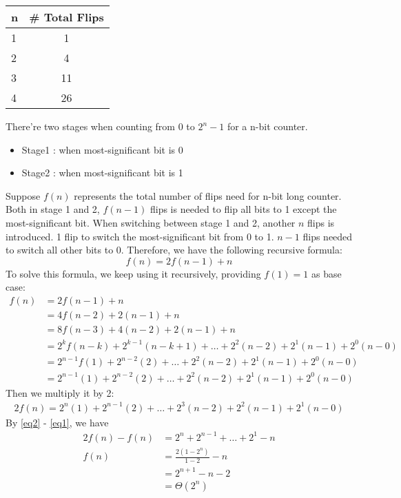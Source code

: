 \documentclass[11pt]{article}
\begin{document}
\begin{tabular}{l | c}
    n	&   \# Total Flips  \\\hline
    1  &   1  \\  
    2  &   4  \\
    3  &   11 \\
    4  &   26 \\
\end{tabular}

There're two stages when counting from 0 to $2^n-1$ for a n-bit counter. 

\begin{itemize}
	\item Stage1 : when most-significant bit is 0
	\item Stage2 : when most-significant bit is 1
\end{itemize}

Suppose $f(n)$ represents the total number of flips need for n-bit long counter. Both in stage 1 and 2, $f(n-1)$ flips is needed to flip all bits to 1 except the most-significant bit. When switching between stage 1 and 2, another $n$ flips is introduced. 1 flip to switch the most-significant bit from 0 to 1. $n-1$ flips needed to switch all other bits to 0. Therefore, we have the following recursive formula:
\[
	f(n) = 2f(n-1) + n
\]
To solve this formula, we keep using it recursively, providing $f(1) = 1$ as base case:
 \begin{align}
 	f(n) 	&= 2f(n-1) + n \nonumber \\
		&= 4f(n-2) + 2(n-1) + n \nonumber \\
		&= 8f(n-3) + 4(n-2) + 2(n-1) + n \nonumber \\
		&= 2^kf(n-k) + 2^{k-1}(n-k+1) + \ldots + 2^2(n-2) + 2^1(n-1) + 2^0(n-0) \nonumber \\
		&= 2^{n-1}f(1) + 2^{n-2}(2) + \ldots + 2^2(n-2) + 2^1(n-1) + 2^0(n-0) \nonumber  \\
		&= 2^{n-1}(1) + 2^{n-2}(2) + \ldots + 2^2(n-2) + 2^1(n-1) + 2^0(n-0) \label{eq1} 
 \end{align}
Then we multiply it by 2:
 \begin{align}
	2f(n) =  2^{n}(1) + 2^{n-1}(2) + \ldots + 2^3(n-2) + 2^2(n-1) + 2^1(n-0) \label{eq2}  
 \end{align}
By \eqref{eq2} - \eqref{eq1}, we have
 \begin{align*}
 	2f(n) - f(n) &= 2^n + 2^{n-1} + \ldots + 2^1 -n \\
	f(n)		&= \frac{2(1-2^n)}{1-2} - n \\
			&= 2^{n+1} - n - 2 \\
			&= \Theta(2^n)
  \end{align*}
  
\end{document}

